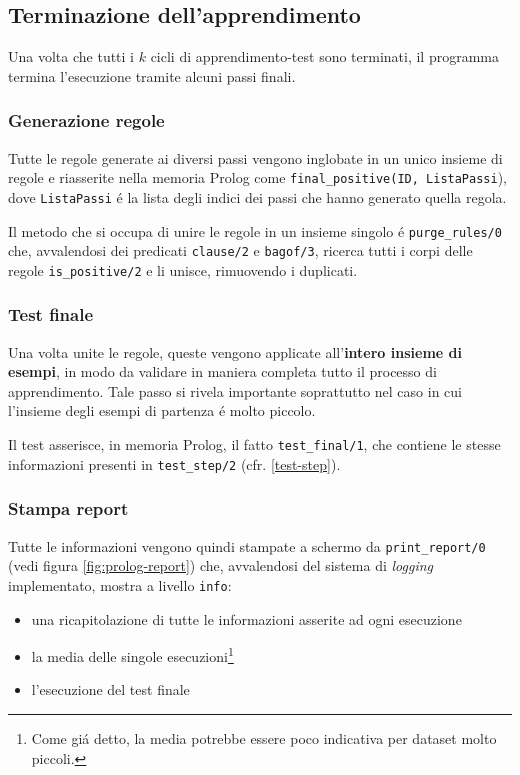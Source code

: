 \documentclass[preprint]{acm_proc_article-sp}
\begin{document}
\subsection{Terminazione dell'apprendimento}
Una volta che tutti i $k$ cicli di apprendimento-test sono terminati, il programma termina l'esecuzione tramite alcuni passi finali.

\subsubsection{Generazione regole}
\label{unione-regole}
Tutte le regole generate ai diversi passi vengono inglobate in un unico insieme di regole e riasserite nella memoria Prolog come \verb|final_positive(ID, ListaPassi|), dove \verb|ListaPassi| \'e la lista degli indici dei passi che hanno generato quella regola.

Il metodo che si occupa di unire le regole in un insieme singolo \'e \verb|purge_rules/0| che, avvalendosi dei predicati \verb|clause/2| e \verb|bagof/3|, ricerca tutti i corpi delle regole \verb|is_positive/2| e li unisce, rimuovendo i duplicati.

\subsubsection{Test finale}
Una volta unite le regole, queste vengono applicate all'\textbf{intero insieme di esempi}, in modo da validare in maniera completa tutto il processo di apprendimento. Tale passo si rivela importante soprattutto nel caso in cui l'insieme degli esempi di partenza \'e molto piccolo.

Il test asserisce, in memoria Prolog, il fatto \verb|test_final/1|, che contiene le stesse informazioni presenti in \verb|test_step/2| (cfr. \ref{test-step}).

\subsubsection{Stampa report}
Tutte le informazioni vengono quindi stampate a schermo da \verb|print_report/0| (vedi figura \ref{fig:prolog-report}) che, avvalendosi del sistema di \textit{logging} implementato, mostra a livello \verb|info|:
\begin{itemize}
\item una ricapitolazione di tutte le informazioni asserite ad ogni esecuzione
\item la media delle singole esecuzioni\footnote{Come gi\'a detto, la media potrebbe essere poco indicativa per dataset molto piccoli.}
\item l'esecuzione del test finale
\end{itemize}
\end{document}
